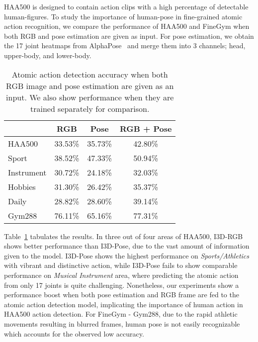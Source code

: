\documentclass[10pt,twocolumn,letterpaper]{article}
\begin{document}
HAA500 is designed to contain action clips with a high percentage of detectable human-figures.
To study the importance of human-pose in fine-grained atomic action recognition, we compare the performance of HAA500 and FineGym when both RGB and pose estimation are given as input. For pose estimation, we obtain the 17 joint heatmaps from AlphaPose~\cite{alphapose} and merge them into 3 channels; head, upper-body, and lower-body.

\begin{table}[h]
    {\small 
    \begin{center}
        \begin{tabular}{|l |c |c || c |}
        \hline
          & RGB  & Pose & RGB + Pose \\
        \hline
        HAA500                    & 33.53\% & 35.73\% & 42.80\% \\
        \:\:\: Sport              & 38.52\% & 47.33\% & 50.94\% \\ 
        \:\:\: Instrument         & 30.72\% & 24.18\% & 32.03\% \\ 
        \:\:\: Hobbies            & 31.30\% & 26.42\% & 35.37\% \\ 
        \:\:\: Daily              & 28.82\% & 28.60\% & 39.14\% \\
Gym288~\cite{finegym} & 76.11\% & 65.16\% & 77.31\% \\
\hline
        \end{tabular}
    \end{center}}
    \caption{Atomic action detection accuracy when both RGB image and pose estimation are given as an input. We also show performance when they are trained separately for comparison.}
    \label{table:human-pose}
\end{table}

Table~\ref{table:human-pose} tabulates the results. In three out of four areas of HAA500, I3D-RGB shows better performance than I3D-Pose, due to the vast amount of information given to the model. I3D-Pose shows the highest performance on \textit{Sports/Athletics} with vibrant and distinctive action, while I3D-Pose fails to show comparable performance on \textit{Musical Instrument} area, where predicting the atomic action from only 17 joints is quite challenging.  Nonetheless, our experiments show a performance boost when both pose estimation and RGB frame are fed to the atomic action detection model, implicating the importance of human action in HAA500 action detection. For FineGym - Gym288, due to the rapid athletic movements resulting in blurred frames, human pose is not easily recognizable which accounts for the observed low accuracy. 
\end{document}
